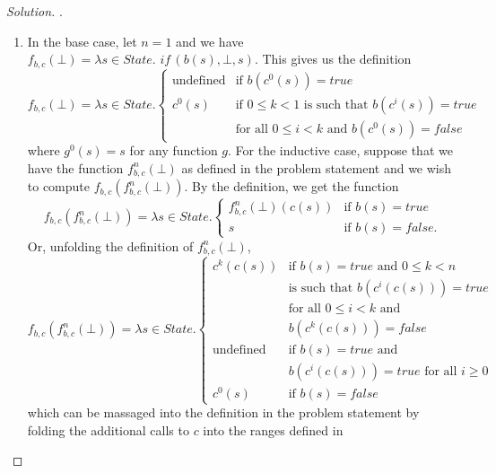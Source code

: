 \documentclass{article}
\begin{document}
\begin{proof}[Solution]
    .
    \begin{enumerate}[label=\alph*)]
        \item In the base case, let $n=1$ and we have $f_{b,c}(\bot)=\lambda
            s\in State. \textit{ if}\,(b(s),\bot,s)$. This gives us the
            definition
            \[
                f_{b,c}(\bot)=\lambda s\in State.\begin{cases}
                    \text{undefined} & \text{if $b(c^0(s))=true$} \\[2ex]
                    c^0(s) & \text{if $0\leq k<1$ is such that $b(c^i(s))=true$} \\
                    & \text{for all $0\leq i<k$ and $b(c^0(s))=false$}
                \end{cases}
            \]
            where $g^0(s)=s$ for any function $g$. For the inductive case,
            suppose that we have the function $f_{b,c}^n(\bot)$ as defined in
            the problem statement and we wish to compute
            $f_{b,c}(f_{b,c}^n(\bot))$. By the definition, we get the function
            \[
                f_{b,c}(f_{b,c}^n(\bot)) = \lambda s\in State. \begin{cases}
                    f_{b,c}^n(\bot)(c(s)) & \text{if $b(s)=true$} \\
                    s & \text{if $b(s)=false$}.
                \end{cases}
            \]
            Or, unfolding the definition of $f_{b,c}^n(\bot)$,
            \[
                f_{b,c}(f_{b,c}^n(\bot)) = \lambda s\in State. \begin{cases}
                    c^k(c(s)) & \text{if $b(s)=true$ and $0\leq k <n$} \\
                    & \text{is such that $b(c^i(c(s)))=true$} \\
                    & \text{for all $0\leq i<k$ and} \\
                    & \text{$b(c^k(c(s)))=false$} \\[2ex]
                    \text{undefined} & \text{if $b(s)=true$ and} \\
                    & \text{$b(c^i(c(s)))=true$ for all $i\geq 0$} \\[2ex]
                    c^0(s) & \text{if $b(s)=false$}
                \end{cases}
            \]
            which can be massaged into the definition in the problem statement
            by folding the additional calls to $c$ into the ranges defined in

\end{enumerate}
\end{proof}
\end{document}
